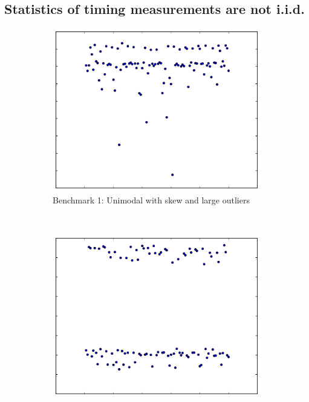 \documentclass[conference]{IEEEtran}
\begin{document}
\subsection{Statistics of timing measurements are not i.i.d.}
\label{sec:toughstats}

\begin{figure}
\centering
\begin{subfigure}{0.22\textwidth}
    \centering
    \includegraphics[width=\textwidth]{figures/fig1/simple_branchsum_fast}
    \caption{Benchmark 1: Unimodal with skew and large outliers}
\end{subfigure}%
~
\begin{subfigure}{0.22\textwidth}
    \centering
    \includegraphics[width=\textwidth]{figures/fig1/bimodal_branchsum}

\end{subfigure}
\end{figure}
\end{document}

